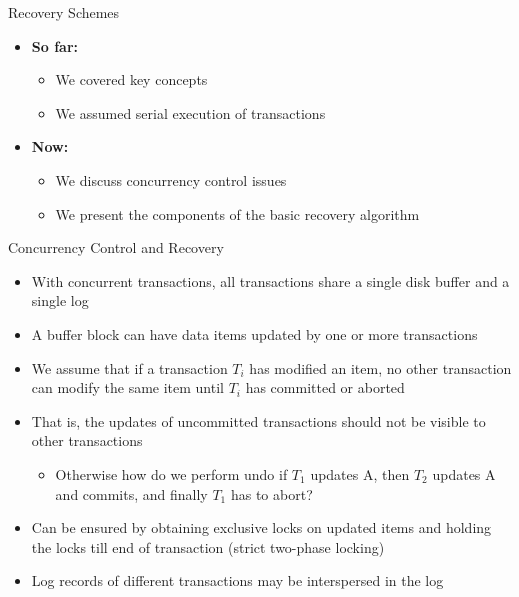 \documentclass[aspectratio=169, xcolor=dvipsnames]{beamer}
\begin{document}
\begin{frame}{Recovery Schemes}
    \begin{itemize}[<+->]
        \item \textbf{So far:}
        \begin{itemize}
            \item[$\triangleright$] We covered key concepts
            \item[$\triangleright$] We assumed serial execution of transactions
        \end{itemize}
        \item \textbf{Now:}
        \begin{itemize}
            \item[$\triangleright$] We discuss concurrency control issues
            \item[$\triangleright$] We present the components of the basic recovery algorithm
        \end{itemize}
    \end{itemize}
\end{frame}

\begin{frame}{Concurrency Control and Recovery}
    \begin{itemize}[<+->]
        \item With concurrent transactions, all transactions share a single disk buffer and a single log
        \item A buffer block can have data items updated by one or more transactions
        \item We assume that if a transaction $T_i$ has modified an item, no other transaction can modify the same item until $T_i$ has committed or aborted
        \item That is, the updates of uncommitted transactions should not be visible to other transactions
        \begin{itemize}
            \item[$\triangleright$] Otherwise how do we perform undo if $T_1$ updates A, then $T_2$ updates A and commits, and finally $T_1$ has to abort?
        \end{itemize}
        \item Can be ensured by obtaining exclusive locks on updated items and holding the locks till end of transaction (strict two-phase locking)
        \item Log records of different transactions may be interspersed in the log
    \end{itemize}
\end{frame}
\end{document}
